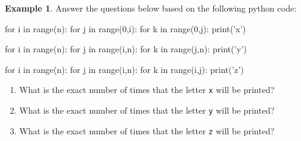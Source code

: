 \documentclass[10pt]{article}
\theoremstyle{definition}
\newtheorem{example}{Example}
\begin{document}
\newpage
\begin{example}
Answer the questions below based on the following python code:
\begin{python}
for i in range(n):
    for j in range(0,i):
        for k in range(0,j):
            print('x')

for i in range(n):
    for j in range(i,n):
        for k in range(j,n):
            print('y')

for i in range(n):
    for j in range(i,n):
        for k in range(i,j):
            print('z')

\end{python}
    \begin{enumerate}
        \item What is the exact number of times that the letter \texttt{x} will be printed?
            \vspace{1.5in}
        \item What is the exact number of times that the letter \texttt{y} will be printed?
            \vspace{1.5in}
        \item What is the exact number of times that the letter \texttt{z} will be printed?
    \end{enumerate}
\end{example}
\end{document}

